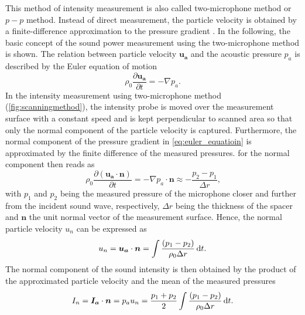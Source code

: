 This method of intensity measurement is also called two-microphone method or $p-p$ method.
Instead of direct measurement, the particle velocity is obtained by a finite-difference approximation to the pressure gradient \cite{jocobsen_2005}\cite{moschioni_2008}.
In the following, the basic concept of the sound power measurement using the two-microphone method is shown. The relation between particle velocity $\boldsymbol{u_a}$ and the acoustic pressure $p_a$ is described by the Euler equation of motion
\begin{equation}
    \rho_0 \frac{\partial \boldsymbol{u_a}}{\partial t} = -\nabla p_a \text{.} \label{eq:euler_equatioin}
\end{equation}
In the intensity measurement using two-microphone method (\cref{fig:scanningmethod}), the intensity probe is moved over the measurement surface with a constant speed and is kept perpendicular to scanned area so that only the normal component of the particle velocity is captured. Furthermore, the normal component of the pressure gradient in \cref{eq:euler_equatioin} is approximated by the finite difference of the measured pressures.  for the normal component then reads as
\begin{equation}
	\rho_0\frac{\partial(\boldsymbol{u_a} \cdot \boldsymbol{n})}{\partial t} = -\nabla p_a \cdot \boldsymbol{n} \approx -\frac{p_2 - p_1}{\Delta r}\text{,}
\end{equation}
with $p_1$ and $p_2$ being the measured pressure of the microphone closer and further from the incident sound wave, respectively, $\Delta r$ being the thickness of the spacer and $\boldsymbol{n}$ the unit normal vector of the measurement surface. Hence, the normal particle velocity $u_n$ can be expressed as
\begin{equation}
   u_n = \boldsymbol{u_a} \cdot \boldsymbol{n} = \int\frac{(p_1 - p_2)}{\rho_0 \Delta r}\dif t \text{.}
\end{equation}
The normal component of the sound intensity is then obtained by the product of the approximated particle velocity and the mean of the measured pressures
\begin{equation}
    I_n = \boldsymbol{I_a} \cdot \boldsymbol{n} = p_a u_n = \frac{p_1 + p_2}{2} \int\frac{(p_1 - p_2)}{\rho_0 \Delta r}\dif t\text{.}
\end{equation}
